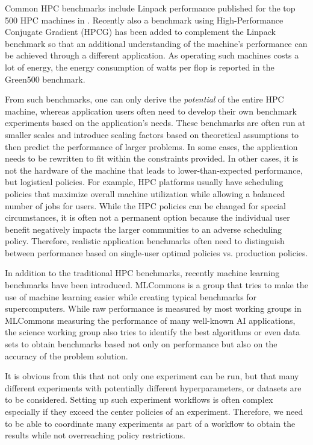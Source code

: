 \documentclass[utf8]{FrontiersinVancouver} %
\begin{document}
Common HPC benchmarks include Linpack performance published for the top 500 HPC machines in \citep{www-top500}. Recently also a benchmark using High-Performance Conjugate Gradient (HPCG) has been added to complement the Linpack benchmark so that an additional understanding of the machine's performance can be achieved \citep{www-top500} through a different application.  As operating such machines costs a lot of energy, the energy consumption of watts per flop is reported in the Green500 benchmark\citep{green500}.

From such benchmarks, one can only derive the {\em potential} of the entire HPC machine, whereas application users often need to develop their own benchmark experiments based on the application's needs. These benchmarks are often run at smaller scales and introduce scaling factors based on theoretical assumptions to then predict the performance of larger problems. In some cases, the application needs to be rewritten to fit within the constraints provided. In other cases, it is not the hardware of the machine that leads to lower-than-expected performance, but logistical policies. For example, HPC platforms usually have scheduling policies that maximize overall machine utilization while allowing a balanced number of jobs for users. While the HPC policies can be changed for special circumstances, it is often not a permanent option because the individual user benefit negatively impacts the larger communities to an adverse scheduling policy. Therefore, realistic application benchmarks often need to distinguish between performance based on single-user optimal policies vs. production policies.

In addition to the traditional HPC benchmarks, recently machine learning benchmarks have been introduced. MLCommons is a group that tries to make the use of machine learning easier while creating typical benchmarks for supercomputers. While raw performance is measured by most working groups in MLCommons measuring the performance of many well-known AI applications, the science working group also tries to identify the best algorithms or even data sets to obtain benchmarks based not only on performance but also on the accuracy of the problem solution.

It is obvious from this that not only one experiment can be run, but that many different experiments with potentially different hyperparameters, or datasets are to be considered. Setting up such experiment workflows is often complex especially if they exceed the center policies of an experiment. Therefore, we need to be able to coordinate many experiments as part of a workflow to obtain the results while not overreaching policy restrictions.
\end{document}
